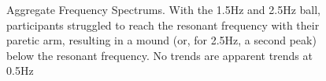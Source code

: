 \documentclass{article}
\begin{document}
\begin{figure}[!ht]
     \centering
     \hfill
     \hfill
	\caption{Aggregate Frequency Spectrums. With the 1.5Hz and 2.5Hz ball, participants struggled to reach the resonant frequency with their paretic arm, resulting in a mound (or, for 2.5Hz, a second peak) below the resonant frequency. No trends are apparent trends at 0.5Hz}
\end{figure}
\end{document}

